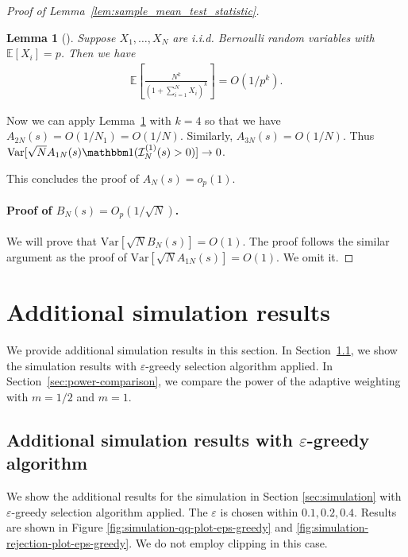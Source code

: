 \documentclass[12pt]{article}
\newtheorem{lemma}{Lemma}
\newcommand{\E}{\mathbb E}								%
\newcommand{\indicator}{\mathbbm 1}						%
\begin{document}
\begin{proof}[Proof of Lemma~\ref{lem:sample_mean_test_statistic}]
\begin{enumerate}
		\begin{lemma}[\citet{cribari2000note}]\label{lem:inverse_binomial_moment}
			Suppose $X_1,\ldots,X_N$ are i.i.d. Bernoulli random variables with $\E[X_i]=p$. Then we have 
			\begin{align*}
				\E\left[\frac{N^k}{(1+\sum_{i=1}^N X_i)^k}\right]=O\left(1/p^k\right).
			\end{align*}
		\end{lemma}
		Now we can apply Lemma~\ref{lem:inverse_binomial_moment} with $k=4$ so that we have $A_{2N}(s)=O(1/N_1)=O(1/N)$. Similarly, $A_{3N}(s)=O(1/N)$. Thus $\mathrm{Var}[\sqrt{N}A_{1N}(s)\indicator(\mathcal{I}_{N}^{(1)}(s)>0)]\rightarrow 0$.
	\end{enumerate}
	This concludes the proof of $A_N(s)=o_{p}(1)$. 
	\paragraph{Proof of $B_N(s)=O_{p}(1/\sqrt{N})$.} 
	We will prove that $\mathrm{Var}[\sqrt{N}B_N(s)]=O(1)$. The proof follows the similar argument as the proof of $\mathrm{Var}[\sqrt{N}A_{1N}(s)]=O(1)$. We omit it.
\end{proof}


\newpage 

\section{Additional simulation results}\label{sec:additional_simulation}

We provide additional simulation results in this section. In Section~\ref{sec:epsilon-greedy-simulation}, we show the simulation results with $\varepsilon$-greedy selection algorithm applied. In Section~\ref{sec:power-comparison}, we compare the power of the adaptive weighting with $m=1/2$ and $m=1$. 

\subsection{Additional simulation results with $\varepsilon$-greedy algorithm}\label{sec:epsilon-greedy-simulation}

We show the additional results for the simulation in Section \ref{sec:simulation} with $\varepsilon$-greedy selection algorithm applied. The $\varepsilon$ is chosen within $0.1,0.2,0.4$. Results are shown in Figure \ref{fig:simulation-qq-plot-eps-greedy} and \ref{fig:simulation-rejection-plot-eps-greedy}. We do not employ clipping in this case.
\end{document}
